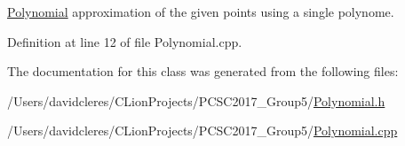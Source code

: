 \mbox{\hyperlink{class_polynomial}{Polynomial}} approximation of the given points using a single polynome. 



Definition at line 12 of file Polynomial.\+cpp.



The documentation for this class was generated from the following files\+:\begin{DoxyCompactItemize}
\item 
/\+Users/davidcleres/\+C\+Lion\+Projects/\+P\+C\+S\+C2017\+\_\+\+Group5/\mbox{\hyperlink{_polynomial_8h}{Polynomial.\+h}}\item 
/\+Users/davidcleres/\+C\+Lion\+Projects/\+P\+C\+S\+C2017\+\_\+\+Group5/\mbox{\hyperlink{_polynomial_8cpp}{Polynomial.\+cpp}}\end{DoxyCompactItemize}
